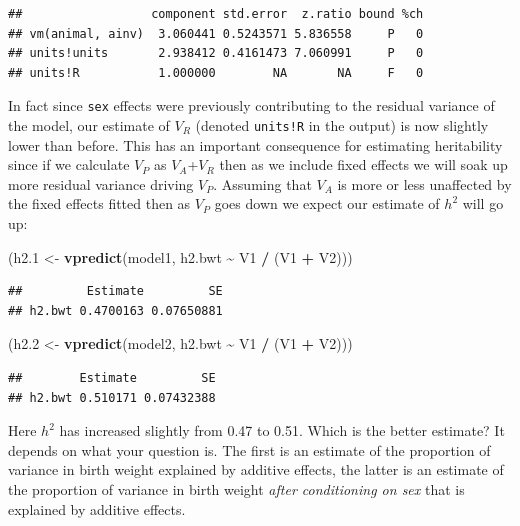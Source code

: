 \documentclass[
  12pt,
]{book}
\newenvironment{Shaded}{\begin{snugshade}}{\end{snugshade}}
\newcommand{\FloatTok}[1]{\textcolor[rgb]{0.00,0.00,0.81}{#1}}
\newcommand{\KeywordTok}[1]{\textcolor[rgb]{0.13,0.29,0.53}{\textbf{#1}}}
\newcommand{\NormalTok}[1]{#1}
\newcommand{\OperatorTok}[1]{\textcolor[rgb]{0.81,0.36,0.00}{\textbf{#1}}}
\newcommand{\StringTok}[1]{\textcolor[rgb]{0.31,0.60,0.02}{#1}}
\begin{document}
\begin{verbatim}
##                  component std.error  z.ratio bound %ch
## vm(animal, ainv)  3.060441 0.5243571 5.836558     P   0
## units!units       2.938412 0.4161473 7.060991     P   0
## units!R           1.000000        NA       NA     F   0
\end{verbatim}

In fact since \texttt{sex} effects were previously contributing to the residual variance of the model, our estimate of \(V_R\) (denoted \texttt{units!R} in the output) is now slightly lower than before. This has an important consequence for estimating heritability since if we calculate \(V_P\) as \(V_A\)+\(V_R\) then as we include fixed effects we will soak up more residual variance driving \(V_P\). Assuming that \(V_A\) is more or less unaffected by the fixed effects fitted then as \(V_P\) goes down we expect our estimate of \(h^2\) will go up:

\begin{Shaded}
\begin{Highlighting}[]
\NormalTok{(h2}\FloatTok{.1}\NormalTok{ \textless{}{-}}\StringTok{ }\KeywordTok{vpredict}\NormalTok{(model1, h2.bwt }\OperatorTok{\textasciitilde{}}\StringTok{ }\NormalTok{V1 }\OperatorTok{/}\StringTok{ }\NormalTok{(V1 }\OperatorTok{+}\StringTok{ }\NormalTok{V2)))}
\end{Highlighting}
\end{Shaded}

\begin{verbatim}
##         Estimate         SE
## h2.bwt 0.4700163 0.07650881
\end{verbatim}

\begin{Shaded}
\begin{Highlighting}[]
\NormalTok{(h2}\FloatTok{.2}\NormalTok{ \textless{}{-}}\StringTok{ }\KeywordTok{vpredict}\NormalTok{(model2, h2.bwt }\OperatorTok{\textasciitilde{}}\StringTok{ }\NormalTok{V1 }\OperatorTok{/}\StringTok{ }\NormalTok{(V1 }\OperatorTok{+}\StringTok{ }\NormalTok{V2)))}
\end{Highlighting}
\end{Shaded}

\begin{verbatim}
##        Estimate         SE
## h2.bwt 0.510171 0.07432388
\end{verbatim}

Here \(h^2\) has increased slightly from 0.47 to 0.51. Which is the better estimate? It depends on what your question is. The first is an estimate of the proportion of variance in birth weight explained by additive effects, the latter is an estimate of the proportion of variance in birth weight \emph{after conditioning on sex} that is explained by additive effects.
\end{document}
